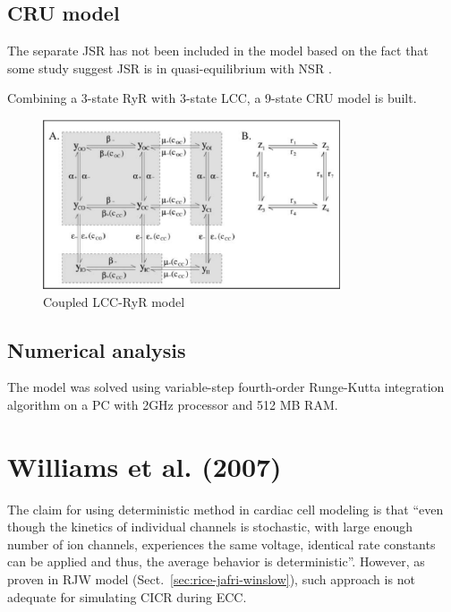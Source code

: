 \subsection{CRU model}

The separate JSR has not been included in the model based on the fact that some
study suggest JSR is in quasi-equilibrium with NSR \citep{shannon2003}.	

Combining a 3-state RyR with 3-state LCC, a 9-state CRU model is built. 

\begin{figure}[hbt]
  \centerline{\includegraphics[height=5cm,
    angle=0]{./images/greenstein_CRU_06.eps}}
\caption{Coupled LCC-RyR model}
\label{fig:greenstein_CRU_06}
\end{figure}


\subsection{Numerical analysis}

The model was solved using variable-step fourth-order Runge-Kutta integration
algorithm on a PC with 2GHz processor and 512 MB RAM.





\section{Williams et al. (2007)}
\label{sec:williams-et-al}



The claim for using deterministic method in cardiac cell modeling is
that ``even though the kinetics of individual channels is stochastic,
with large enough number of ion channels, experiences the same
voltage, identical rate constants can be applied and thus, the average
behavior is deterministic''. However, as proven in RJW model
(Sect.~\ref{sec:rice-jafri-winslow}), such approach is not adequate
for simulating CICR during ECC.

